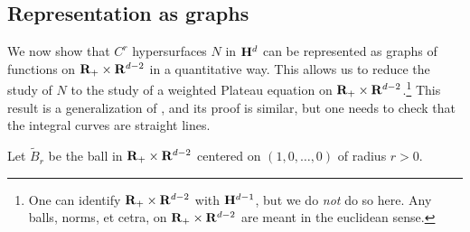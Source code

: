 \subsection{Representation as graphs}

We now show that $C^r$ hypersurfaces $N$ in $\mathbf H^d$ can be represented as graphs of functions on $\mathbf{R}_+ \times \mathbf{R}^{d - 2}$ in a quantitative way.
This allows us to reduce the study of $N$ to the study of a weighted Plateau equation on $\mathbf{R}_+ \times \mathbf{R}^{d - 2}$.\footnote{One can identify $\mathbf{R}_+ \times \mathbf{R}^{d - 2}$ with $\mathbf H^{d - 1}$, but we do \emph{not} do so here. Any balls, norms, et cetra, on $\mathbf{R}_+ \times \mathbf{R}^{d - 2}$ are meant in the euclidean sense.}
This result is a generalization of \cite[Theorem 4.8]{Giusti77}, and its proof is similar, but one needs to check that the integral curves are straight lines.

\begin{notation}
Let $\tilde B_r$ be the ball in $\mathbf{R}_+ \times \mathbf{R}^{d - 2}$ centered on $(1, 0, \dots, 0)$ of radius $r > 0$.
\end{notation}

